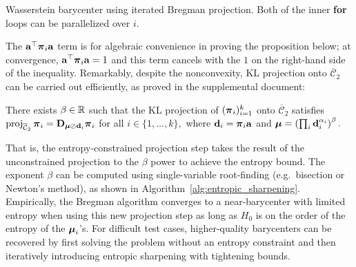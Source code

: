 \begin{algorithm}[t]
\vspace{-3mm}
\caption{Wasserstein barycenter using iterated Bregman projection.  Both of the inner \textbf{for} loops can be parallelized over $i$.}
\label{alg:barycenter}
\end{algorithm}

The $\mathbf a^\top \boldsymbol{\pi}_i\mathbf a$ term is for algebraic convenience in proving the proposition below; at convergence, $\mathbf a^\top\boldsymbol{\pi}_i\mathbf a=1$ and this term cancels with the $1$ on the right-hand side of the inequality.  Remarkably, despite the nonconvexity, KL projection onto $\overline{\mathcal C}_2$ can be carried out efficiently, as proved in the supplemental document:
\begin{proposition}
There exists $\beta\in\mathbb{R}$ such that the KL projection of $(\boldsymbol{\pi}_i)_{i=1}^k$ %
onto $\overline {\mathcal C}_2$ satisfies $\mathrm{proj}_{\overline{\mathcal C}_2}\,\boldsymbol{\pi}_i=\mathbf{D}_{\boldsymbol{\mu}\oslash\mathbf d_i}\boldsymbol{\pi}_i$ for all $i\in\{1,\ldots,k\},$ where $\mathbf d_i=\boldsymbol{\pi}_i\mathbf a$ and $\boldsymbol{\mu}=\left(\prod_i \mathbf d_{i}^{\alpha_i}\right)^\beta.$
\end{proposition}
That is, the entropy-constrained projection step takes the result of the unconstrained projection to the $\beta$ power to achieve the entropy bound.  The exponent $\beta$ can be computed using single-variable root-finding (e.g.\ bisection or Newton's method), as shown in Algorithm~\ref{alg:entropic_sharpening}.  Empirically, the Bregman algorithm converges to a near-barycenter with limited entropy when using this new projection step as long as $H_0$ is on the order of the entropy of the $\boldsymbol{\mu}_i$'s.  For difficult test cases, higher-quality barycenters can be recovered by first solving the problem without an entropy constraint and then iteratively introducing entropic sharpening with tightening bounds.

